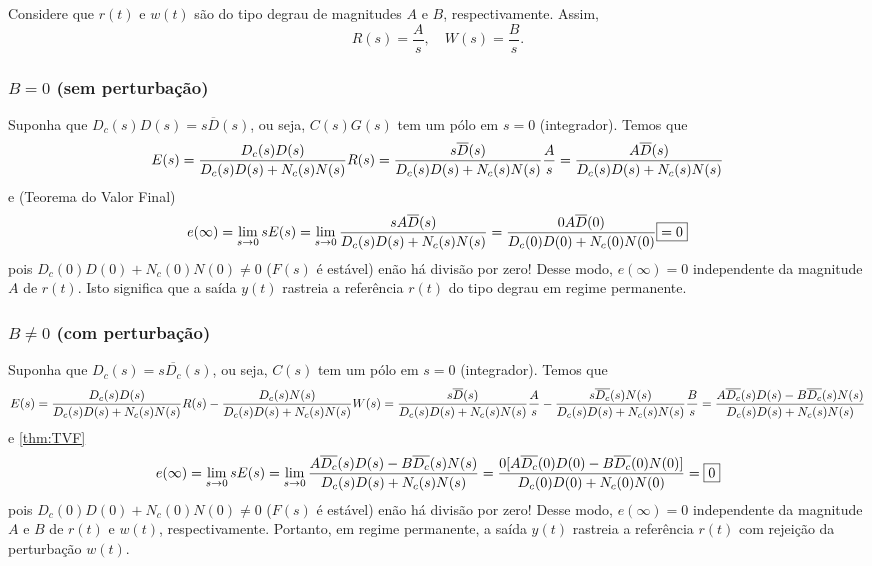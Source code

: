 \documentclass[
]{book}
\theoremstyle{definition}
\theoremstyle{definition}
\theoremstyle{definition}
\theoremstyle{remark}
\begin{document}
Considere que \(r(t)\) e \(w(t)\) são do tipo degrau de magnitudes \(A\) e \(B\), respectivamente. Assim,
\[
R(s) = \frac{A}{s}, \quad W(s) = \frac{B}{s}.
\]

\hypertarget{b0-sem-perturbauxe7uxe3o}{%
\subsubsection*{\texorpdfstring{\textbf{\(B=0\) (sem perturbação)}}{B=0 (sem perturbação)}}\label{b0-sem-perturbauxe7uxe3o}}

Suponha que \(D_c(s)D(s) = s\overline{D}(s)\), ou seja, \(C(s)G(s)\) tem um pólo em \(s=0\) (integrador). Temos que
\[
E(s) = \frac{D_c(s)D(s)}{D_c(s)D(s)+N_c(s)N(s)}R(s) = \frac{s\overline{D}(s)}{D_c(s)D(s)+N_c(s)N(s)}\frac{A}{s}\\
= \frac{A\overline{D}(s)}{D_c(s)D(s)+N_c(s)N(s)}
\]
e (Teorema do Valor Final)
\[
e(\infty) = \lim\limits_{s\to0}{sE(s)} =
\lim\limits_{s\to0}{\frac{sA\overline{D}(s)}{D_c(s)D(s)+N_c(s)N(s)}} = \frac{0A\overline{D}(0)}{D_c(0)D(0)+N_c(0)N(0)} \\
\boxed{=0}
\]
pois \(D_c(0)D(0) + N_c(0)N(0) \neq 0\) (\(F(s)\) é estável) enão há divisão por zero! Desse modo, \(e(\infty) = 0\) independente da magnitude \(A\) de \(r(t)\). Isto significa que a saída \(y(t)\) rastreia a referência \(r(t)\) do tipo degrau em regime permanente.

\hypertarget{bneq0-com-perturbauxe7uxe3o}{%
\subsubsection*{\texorpdfstring{\textbf{\(B\neq0\) (com perturbação)}}{B\textbackslash neq0 (com perturbação)}}\label{bneq0-com-perturbauxe7uxe3o}}

Suponha que \(D_c(s) = s\overline{D_c}(s)\), ou seja, \(C(s)\) tem um pólo em \(s=0\) (integrador). Temos que
\[
E(s) = \frac{D_c(s)D(s)}{D_c(s)D(s)+N_c(s)N(s)}R(s)-\frac{D_c(s)N(s)}{D_c(s)D(s)+N_c(s)N(s)}W(s) \\
= \frac{s\overline{D}(s)}{D_c(s)D(s)+N_c(s)N(s)}\frac{A}{s} - \frac{s\overline{D_c}(s)N(s)}{D_c(s)D(s)+N_c(s)N(s)}\frac{B}{s}\\
= \frac{A\overline{D_c}(s)D(s) - B\overline{D_c}(s)N(s)}{D_c(s)D(s)+N_c(s)N(s)}
\]
e \ref{thm:TVF}
\[
e(\infty) = \lim\limits_{s\to0}{sE(s)} =
\lim\limits_{s\to0}{\frac{A\overline{D_c}(s)D(s) - B\overline{D_c}(s)N(s)}{D_c(s)D(s)+N_c(s)N(s)}} \\
= \frac{0[A\overline{D_c}(0)D(0) - B\overline{D_c}(0)N(0)]}{D_c(0)D(0)+N_c(0)N(0)} =
\boxed{0}
\]
pois \(D_c(0)D(0) + N_c(0)N(0) \neq 0\) (\(F(s)\) é estável) enão há divisão por zero! Desse modo, \(e(\infty) = 0\) independente da magnitude \(A\) e \(B\) de \(r(t)\) e \(w(t)\), respectivamente. Portanto, em regime permanente, a saída \(y(t)\) rastreia a referência \(r(t)\) com rejeição da perturbação \(w(t)\).
\end{document}
